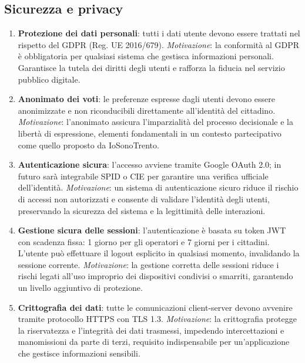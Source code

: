 \documentclass{article}
\begin{document}
\subsection{Sicurezza e privacy}
\begin{enumerate}[label=\textbf{RNF\arabic*}, resume]
	\item \textbf{Protezione dei dati personali}: tutti i dati utente devono essere trattati nel rispetto del GDPR (Reg. UE 2016/679).  
	\textit{Motivazione}: la conformità al GDPR è obbligatoria per qualsiasi sistema che gestisca informazioni personali. Garantisce la tutela dei diritti degli utenti e rafforza la fiducia nel servizio pubblico digitale.

	\item \textbf{Anonimato dei voti}: le preferenze espresse dagli utenti devono essere anonimizzate e non riconducibili direttamente all’identità del cittadino.  
	\textit{Motivazione}: l’anonimato assicura l’imparzialità del processo decisionale e la libertà di espressione, elementi fondamentali in un contesto partecipativo come quello proposto da IoSonoTrento.

	\item \textbf{Autenticazione sicura}: l’accesso avviene tramite Google OAuth 2.0; in futuro sarà integrabile SPID o CIE per garantire una verifica ufficiale dell’identità.  
	\textit{Motivazione}: un sistema di autenticazione sicuro riduce il rischio di accessi non autorizzati e consente di validare l’identità degli utenti, preservando la sicurezza del sistema e la legittimità delle interazioni.

	\item \textbf{Gestione sicura delle sessioni}: l’autenticazione è basata su token JWT con scadenza fissa: 1 giorno per gli operatori e 7 giorni per i cittadini. L’utente può effettuare il logout esplicito in qualsiasi momento, invalidando la sessione corrente.
	\textit{Motivazione}: la gestione corretta delle sessioni riduce i rischi legati all’uso improprio dei dispositivi condivisi o smarriti, garantendo un livello aggiuntivo di protezione.

	\item \textbf{Crittografia dei dati}: tutte le comunicazioni client-server devono avvenire tramite protocollo HTTPS con TLS 1.3.  
	\textit{Motivazione}: la crittografia protegge la riservatezza e l’integrità dei dati trasmessi, impedendo intercettazioni e manomissioni da parte di terzi, requisito indispensabile per un’applicazione che gestisce informazioni sensibili.
\end{enumerate}
\end{document}
